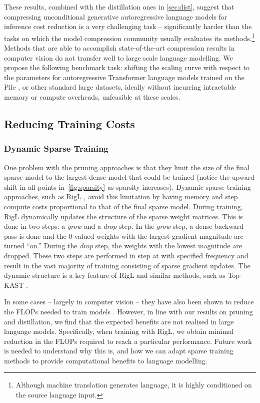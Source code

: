 \documentclass[11pt, a4paper, logo, internal, copyright, nonumbering]{deepmind}
\begin{document}
These results, combined with the distillation ones in \autoref{sec:dist}, suggest that compressing unconditional generative autoregressive language models for inference cost reduction is a very challenging task -- significantly harder than the tasks on which the model compression community usually evaluates its methods.\footnote{Although machine translation generates language, it is highly conditioned on the source language input.} Methods that are able to accomplish state-of-the-art compression results in computer vision do not transfer well to large scale language modelling.
We propose the following benchmark task: 
shifting the scaling curve with respect to the parameters for autoregressive Transformer language models trained on the Pile \citep{pile},
or other standard large datasets, ideally without incurring intractable memory or compute overheads, unfeasible at these scales.

\subsection{Reducing Training Costs}
\label{sec:training-cost}

\subsubsection{Dynamic Sparse Training}
One problem with the pruning approaches is that they limit the size of the final sparse model to the largest dense model that could be trained (notice the upward shift in all points in~\autoref{fig:sparsity} as sparsity increases). 
Dynamic sparse training approaches, such as RigL \citep{evci2020rigging}, avoid this limitation by having memory and step compute costs proportional to that of the final sparse model.
During training, RigL \citep{evci2020rigging} dynamically updates the structure of the sparse weight matrices. 
This is done in two steps: a \textit{grow} and a \textit{drop} step. 
In the \textit{grow} step, a dense backward pass is done and the 0-valued weights with the largest gradient magnitude are turned ``on.'' During the \textit{drop} step, the weights with the lowest magnitude are dropped. 
These two steps are performed in step at with specified frequency and result in the vast majority of training consisting of sparse gradient updates.
The dynamic structure is a key feature of RigL and similar methods, such as Top-KAST \citep{jayakumar2021top}.


In some cases -- largely in computer vision -- they have also been shown to reduce the FLOPs needed to train models \citep{evci2020rigging, jayakumar2021top}.
However, in line with our results on pruning and distillation, we find that the expected benefits are not realised in large language models. 
Specifically, when training with RigL, we obtain minimal reduction in the FLOPs required to reach a particular performance.
Future work is needed to understand why this is, and how we can adapt sparse training methods to provide computational benefits to language modelling.
\end{document}
